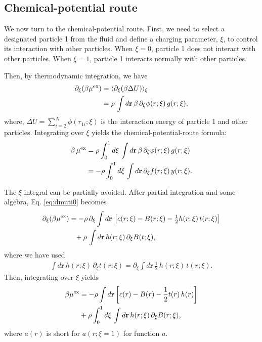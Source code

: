 \documentclass[aip,jcp,reprint,superscriptaddress]{revtex4-1}
\newcommand{\vct}[1]{\mathbf{#1}}
\providecommand{\vr}{} %
\renewcommand{\vr}{\vct{r}}
\begin{document}
\subsection{
\label{sec:xiroute}
Chemical-potential route}





We now turn to the chemical-potential route.
%
First, we need to
select a designated particle 1 from the fluid
and define a charging parameter, $\xi$,
to control its interaction with other particles.
%
When $\xi = 0$,
particle 1 does not interact with other particles.
%
When $\xi = 1$,
particle 1 interacts normally with other particles.



Then,
by thermodynamic integration,
we have
%
\begin{align}
\partial_\xi ( \beta \mu^\mathrm{ex} )
&=
\langle \partial_\xi (\beta \Delta U) \rangle_\xi
\notag \\
&=
\rho \, \int d\vr \,
\beta \, \partial_\xi \phi(r; \xi) \, g(r; \xi),
\label{eq:dmuti0}
\end{align}
%
where,
$\Delta U = \sum_{i = 2}^N \phi(r_{1i}; \xi)$
is the interaction energy of particle 1
and other particles.
%
Integrating over $\xi$ yields
the chemical-potential-route formula:
%
\begin{align}
\beta \, \mu^\mathrm{ex}
&=
\rho \int_0^1 d\xi \,
\int d\vr \, \beta \, \partial_\xi \phi(r; \xi) \,
g(r; \xi)
\notag \\
&=
-\rho \int_0^1 d\xi \,
\int d\vr \, \partial_\xi f(r; \xi) \,
y(r; \xi).
\label{eq:muti0}
\end{align}



The $\xi$ integral can be partially avoided.
%
After partial integration and some algebra,
Eq. \eqref{eq:dmuti0} becomes
%
\begin{align}
\partial_\xi ( \beta \mu^\mathrm{ex} )
&=
-\rho \, \partial_\xi \int d\vr \,
    \left[
      c(r; \xi)
    - B(r; \xi)
    - \tfrac{1}{2} h(r; \xi) \, t(r; \xi)
    \right]
\notag \\
&\phantom{=}
  +\rho \, \int d\vr \,
  h(r; \xi) \,
  \partial_\xi B(t; \xi),
\label{eq:dmuti}
\end{align}
%
where we have used
\begin{align*}
\int d\vr \,
h(r; \xi) \, \partial_\xi t(r; \xi)
=
\partial_\xi \int d\vr \,
\frac{1}{2} \, h(r; \xi) \, t(r; \xi).
\end{align*}
%
Then, integrating over $\xi$ yields
%
\begin{align}
\beta \mu^\mathrm{ex}
&=
-\rho \int d\vr
\left[
  c(r) - B(r) - \frac{1}{2} t(r) \, h(r)
\right]
\notag \\
&
+ \rho \int_0^1 d\xi \, \int d\vr
  \, h(r; \xi) \, \partial_\xi B(r; \xi),
\label{eq:muti}
\end{align}
%
where
$a(r)$ is short for $a(r; \xi = 1)$
for function $a$.
\end{document}

